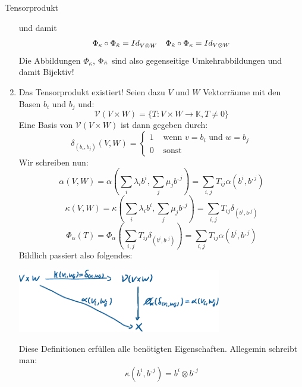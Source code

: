 \begin{Def}{Tensorprodukt}
\begin{enumerate}
\begin{center}
\end{center}
und damit $$\Phi_\kappa \circ \Phi_{\Tilde{\kappa}}=Id_{V\Tilde{\otimes}W} \quad \Phi_{\Tilde{\kappa}} \circ \Phi_\kappa  =Id_{V\otimes W}$$
Die Abbildungen $\Phi_\kappa$, $\Phi_{\Tilde{\kappa}}$ sind also gegenseitige Umkehrabbildungen und damit Bijektiv!
\item Das Tensorprodukt existiert! Seien dazu $V$ und $W$ Vektorräume mit den Basen $b_i$ und $b_j$ und:
$$\mathcal{V}(V\times W)=\{ T: V\times W \rightarrow \mathbb{K}, T\neq 0 \}$$
Eine Basis von $\mathcal{V}(V\times W)$ ist dann gegeben durch:
$$\delta_{(b_i, b_j)}(V,W)=\begin{cases}
    1 & \mbox{ wenn $v=b_i$ und $w=b_j$} \\
    0 & \mbox{ sonst}
\end{cases}$$
Wir schreiben nun:
$$\alpha(V,W) = \alpha(\sum_i \lambda_ib^i, \sum_j \mu_jb^{,j})=\sum_{i,j} T_{ij}\alpha(b^i, b^{,j})$$
$$\kappa(V, W)= \kappa(\sum_i \lambda_ib^i, \sum_j \mu_jb^{,j})=\sum_{i,j} T_{ij}\delta_{(b^i, b^{,j})}$$
$$\Phi_\alpha(T)=\Phi_\alpha(\sum_{i,j} T_{ij}\delta_{(b^i, b^{,j})})=\sum_{i,j}T_{ij}\alpha(b^i, b^{,j})$$
Bildlich passiert also folgendes:
\begin{center}
    \includegraphics[width=0.7\textwidth]{Dateien/Tensor3.pdf}
\end{center}
Diese Definitionen erfüllen alle benötigten Eigenschaften. Allegemin schreibt man:
$$\kappa(b^i, b^{,j})=b^i\otimes b^{,j}$$
\end{enumerate}
\end{Def}

